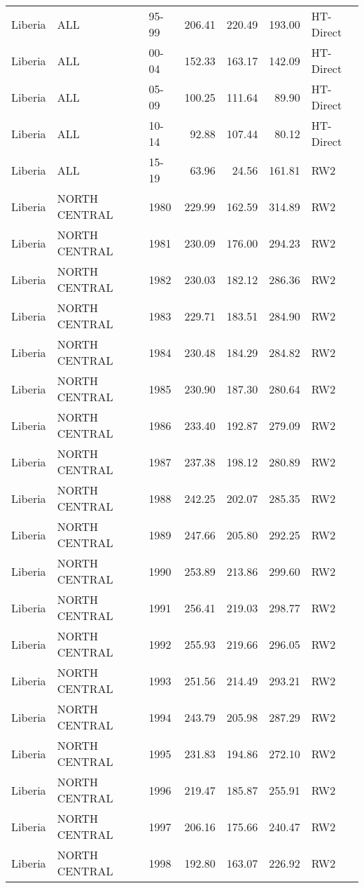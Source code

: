 \begin{longtable}{lllrrrl}
  Liberia & ALL & 95-99 & 206.41 & 220.49 & 193.00 & HT-Direct \\ 
  Liberia & ALL & 00-04 & 152.33 & 163.17 & 142.09 & HT-Direct \\ 
  Liberia & ALL & 05-09 & 100.25 & 111.64 & 89.90 & HT-Direct \\ 
  Liberia & ALL & 10-14 & 92.88 & 107.44 & 80.12 & HT-Direct \\ 
  Liberia & ALL & 15-19 & 63.96 & 24.56 & 161.81 & RW2 \\ 
  Liberia & NORTH CENTRAL & 1980 & 229.99 & 162.59 & 314.89 & RW2 \\ 
  Liberia & NORTH CENTRAL & 1981 & 230.09 & 176.00 & 294.23 & RW2 \\ 
  Liberia & NORTH CENTRAL & 1982 & 230.03 & 182.12 & 286.36 & RW2 \\ 
  Liberia & NORTH CENTRAL & 1983 & 229.71 & 183.51 & 284.90 & RW2 \\ 
  Liberia & NORTH CENTRAL & 1984 & 230.48 & 184.29 & 284.82 & RW2 \\ 
  Liberia & NORTH CENTRAL & 1985 & 230.90 & 187.30 & 280.64 & RW2 \\ 
  Liberia & NORTH CENTRAL & 1986 & 233.40 & 192.87 & 279.09 & RW2 \\ 
  Liberia & NORTH CENTRAL & 1987 & 237.38 & 198.12 & 280.89 & RW2 \\ 
  Liberia & NORTH CENTRAL & 1988 & 242.25 & 202.07 & 285.35 & RW2 \\ 
  Liberia & NORTH CENTRAL & 1989 & 247.66 & 205.80 & 292.25 & RW2 \\ 
  Liberia & NORTH CENTRAL & 1990 & 253.89 & 213.86 & 299.60 & RW2 \\ 
  Liberia & NORTH CENTRAL & 1991 & 256.41 & 219.03 & 298.77 & RW2 \\ 
  Liberia & NORTH CENTRAL & 1992 & 255.93 & 219.66 & 296.05 & RW2 \\ 
  Liberia & NORTH CENTRAL & 1993 & 251.56 & 214.49 & 293.21 & RW2 \\ 
  Liberia & NORTH CENTRAL & 1994 & 243.79 & 205.98 & 287.29 & RW2 \\ 
  Liberia & NORTH CENTRAL & 1995 & 231.83 & 194.86 & 272.10 & RW2 \\ 
  Liberia & NORTH CENTRAL & 1996 & 219.47 & 185.87 & 255.91 & RW2 \\ 
  Liberia & NORTH CENTRAL & 1997 & 206.16 & 175.66 & 240.47 & RW2 \\ 
  Liberia & NORTH CENTRAL & 1998 & 192.80 & 163.07 & 226.92 & RW2 \\ 

\end{longtable}
